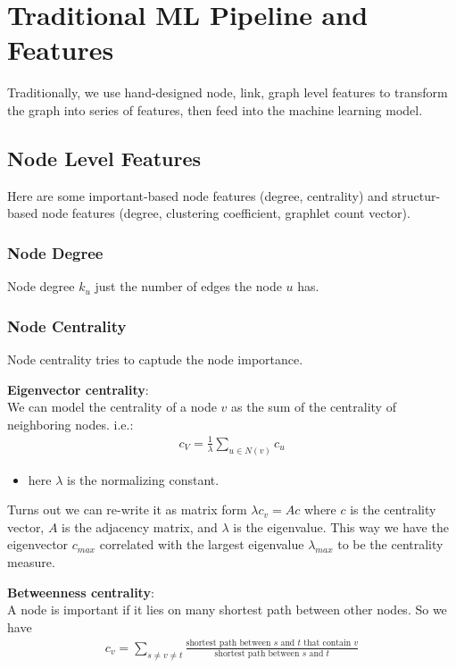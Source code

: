 \chapter{Traditional ML Pipeline and Features}
Traditionally, we use hand-designed node, link, graph level features to transform the graph into series of features, then feed into the machine learning model. 
\section{Node Level Features} 
Here are some important-based node features (degree, centrality) and structur-based node features (degree, clustering coefficient, graphlet count vector). 

\subsection{Node Degree}
Node degree $k_u$ just the number of edges the node $u$ has. 

\subsection{Node Centrality}
Node centrality tries to captude the node importance. \\
\par 

\textbf{Eigenvector centrality}:\\
We can model the centrality of a node $v$ as the sum of the centrality of neighboring nodes. i.e.: 
    \begin{align*}
        c_V = \frac{1}{\lambda} \sum_{u\in N(v)}c_u
    \end{align*}
    \begin{itemize}
        \item here $\lambda$ is the normalizing constant. 
    \end{itemize}
Turns out we can re-write it as matrix form $\lambda c_v = Ac$ where $c$ is the centrality vector, $A$ is the adjacency matrix, and $\lambda$ is the eigenvalue. This way we have the eigenvector $c_{max}$ correlated with the largest eigenvalue $\lambda_{max}$ to be the centrality measure. \\
\par

\textbf{Betweenness centrality}:\\
A node is important if it lies on many shortest path between other nodes. So we have 
    \begin{align*}
        c_v = \sum_{s \neq v \neq t} \frac{\textrm{shortest path between $s$ and $t$ that contain $v$}}{\textrm{shortest path between $s$ and $t$}}
    \end{align*}
\\
\par

